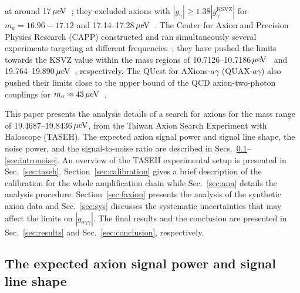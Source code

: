 \documentclass[%
reprint, %
superscriptaddress,
 amsmath,amssymb,
 aps
]{revtex4-2}
\begin{document}
at around 17$\,\mu\text{e\hspace{-.08em}V}$~\cite{HAYSTACI}; they excluded 
axions with 
$\left|g_{\gamma}\right|\geq 1.38 \left|g_{\gamma}^\text{KSVZ}\right|$ 
for $m_a=16.96-17.12$ and 
17.14--17.28$\,\mu\text{e\hspace{-.08em}V}$~\cite{HAYSTACI}. The Center 
for Axion and Precision Physics Research (CAPP) constructed 
and ran simultaneously several experiments targeting at 
different frequencies~\cite{CAPPII,CAPPIII,CAPPI,CAPPIV}; 
they have pushed the limits towards the KSVZ value within the mass 
regions of 10.7126--10.7186$\,\mu\text{e\hspace{-.08em}V}$~\cite{CAPPI} and 
19.764--19.890$\,\mu\text{e\hspace{-.08em}V}$~\cite{CAPPIV}, respectively. 
The QUest for AXions-$a\gamma$ (QUAX-$a\gamma$) also pushed their limits 
close to the upper bound of the QCD axion-two-photon couplings for 
$m_a\approx43\,\mu\text{e\hspace{-.08em}V}$~\cite{QUAX}.   

This paper presents the analysis details of a search for axions for the mass 
range of 19.4687--19.8436$\,\mu\text{e\hspace{-.08em}V}$, 
from the Taiwan Axion Search Experiment with Haloscope (TASEH). 
The expected axion signal power and signal line shape, the noise power, 
and the signal-to-noise ratio are described in 
Secs.~\ref{sec:introsignal}--\ref{sec:intronoise}. An overview 
of the TASEH experimental setup is presented in Sec.~\ref{sec:taseh}. 
Section~\ref{sec:calibration} gives a brief description of the calibration for 
the whole amplification chain while Sec.~\ref{sec:ana} details the analysis 
procedure. Section~\ref{sec:faxion} presents the analysis of the synthetic 
axion data and Sec.~\ref{sec:sys} discusses the systematic uncertainties that 
may affect the limits on $\left|g_{a\gamma\gamma}\right|$. 
The final results and the conclusion are presented in Sec.~\ref{sec:results} 
and Sec.~\ref{sec:conclusion}, respectively. 


\subsection{The expected axion signal power and signal line shape}
\label{sec:introsignal}
\end{document}
